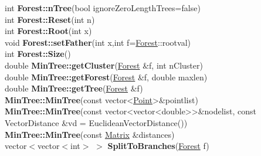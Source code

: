 \documentclass[10pt,titlepage]{article}
\def\functionlistentry#1#2#3#4#5#6{\noindent #1 {\bf #2}(#3) \dotfill #6\\}
\begin{document}
{{\functionlistentry{int}{Forest::nTree}{bool ignoreZeroLengthTrees=false}{1279}{graph}{}
\functionlistentry{int}{Forest::Reset}{int n}{1277}{graph}{}
\functionlistentry{int}{Forest::Root}{int x}{1287}{graph}{}
\functionlistentry{void}{Forest::setFather}{int x,int f=\hyperlink{Forest}{Forest}::rootval}{1282}{graph}{}
\functionlistentry{int}{Forest::Size}{}{1278}{graph}{}
\functionlistentry{double}{MinTree::getCluster}{\hyperlink{Forest}{Forest} \&f, int nCluster}{1294}{graph}{}
\functionlistentry{double}{MinTree::getForest}{\hyperlink{Forest}{Forest} \&f, double maxlen}{1293}{graph}{}
\functionlistentry{double}{MinTree::getTree}{\hyperlink{Forest}{Forest} \&f}{1292}{graph}{}
\functionlistentry{}{MinTree::MinTree}{const vector\textless {}\hyperlink{Point}{Point}\textgreater  \&pointlist}{1289}{graph}{}
\functionlistentry{}{MinTree::MinTree}{const vector\textless {}vector\textless {}double\textgreater  \textgreater  \&nodelist, const VectorDistance \&vd = EuclideanVectorDistance()}{1290}{graph}{}
\functionlistentry{}{MinTree::MinTree}{const \hyperlink{Matrix}{Matrix} \&distances}{1291}{graph}{}
\functionlistentry{vector$<$vector$<$int$>$ $>$}{SplitToBranches}{\hyperlink{Forest}{Forest} f}{1297}{graph}{}

}}
\end{document}
